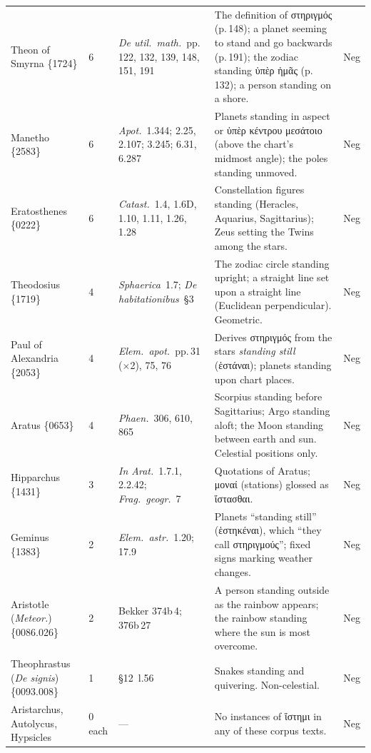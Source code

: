 \documentclass[11pt,a4paper]{article}
\newcommand{\grk}[1]{{\fontencoding{LGR}\selectfont #1}}
\newcommand{\grk}[1]{{\greekfont #1}}
\begin{document}
\begin{longtable}{@{}p{3.2cm}p{1.0cm}p{4.2cm}p{4.2cm}p{0.7cm}@{}}
Theon of Smyrna \{1724\} & 6 &
  \textit{De util.\ math.}~pp.\,122, 132, 139, 148, 151, 191 &
  The definition of \grk{στηριγμός} (p.\,148); a planet seeming to stand
  and go backwards (p.\,191); the zodiac standing \grk{ὑπὲρ ἡμᾶς}
  (p.\,132); a person standing on a shore. & Neg \\[3pt]
Manetho \{2583\} & 6 &
  \textit{Apot.}~1.344; 2.25, 2.107; 3.245; 6.31, 6.287 &
  Planets standing in aspect or \grk{ὑπὲρ κέντρου μεσάτοιο} (above the
  chart's midmost angle); the poles standing unmoved. & Neg \\[3pt]
Eratosthenes \{0222\} & 6 &
  \textit{Catast.}~1.4, 1.6D, 1.10, 1.11, 1.26, 1.28 &
  Constellation figures standing (Heracles, Aquarius, Sagittarius); Zeus
  setting the Twins among the stars. & Neg \\[3pt]
Theodosius \{1719\} & 4 &
  \textit{Sphaerica}~1.7; \textit{De habitationibus}~§3 &
  The zodiac circle standing upright; a straight line set upon a straight
  line (Euclidean perpendicular). Geometric. & Neg \\[3pt]
Paul of Alexandria \{2053\} & 4 &
  \textit{Elem.\ apot.}~pp.\,31 ($\times$2), 75, 76 &
  Derives \grk{στηριγμός} from the stars \emph{standing still}
  (\grk{ἑστάναι}); planets standing upon chart places. & Neg \\[3pt]
Aratus \{0653\} & 4 &
  \textit{Phaen.}~306, 610, 865 &
  Scorpius standing before Sagittarius; Argo standing aloft; the Moon
  standing between earth and sun. Celestial positions only. & Neg \\[3pt]
Hipparchus \{1431\} & 3 &
  \textit{In Arat.}~1.7.1, 2.2.42; \textit{Frag.\ geogr.}~7 &
  Quotations of Aratus; \grk{μοναί} (stations) glossed as
  \grk{ἵστασθαι}. & Neg \\[3pt]
Geminus \{1383\} & 2 &
  \textit{Elem.\ astr.}~1.20; 17.9 &
  Planets ``standing still'' (\grk{ἑστηκέναι}), which ``they call
  \grk{στηριγμούς}''; fixed signs marking weather changes. & Neg \\[3pt]
Aristotle (\textit{Meteor.}) \{0086.026\} & 2 &
  Bekker 374b\,4; 376b\,27 &
  A person standing outside as the rainbow appears; the rainbow standing
  where the sun is most overcome. & Neg \\[3pt]
Theophrastus (\textit{De signis}) \{0093.008\} & 1 &
  §12~l.56 &
  Snakes standing and quivering. Non-celestial. & Neg \\[3pt]
Aristarchus, Autolycus,
  Hypsicles & 0 each &
  --- & No instances of \grk{ἵστημι} in any of these corpus texts. & Neg \\[6pt]


\end{longtable}
\end{document}
